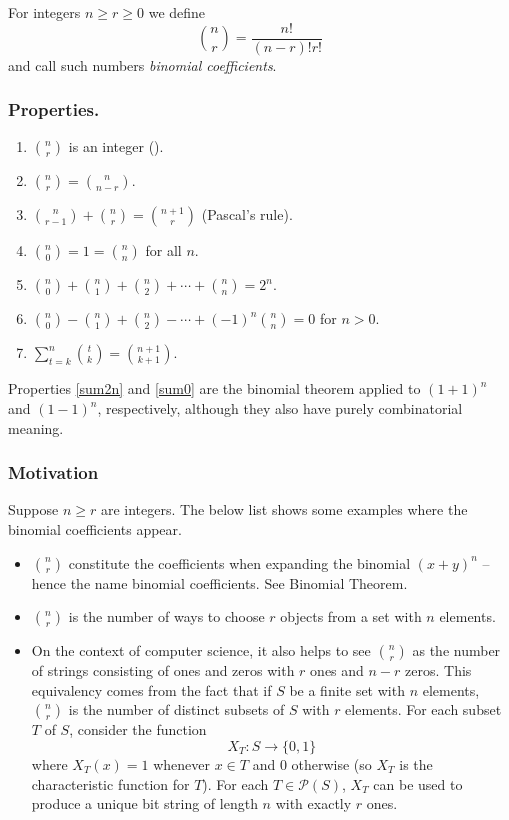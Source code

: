 \documentclass{article}
\begin{document}
For integers $n\ge r \ge 0$ we define 
$$ 
{n\choose r} = \frac{n!}{(n-r)!r!}
$$ 
and call such numbers \emph{binomial coefficients}.

\subsubsection*{Properties.}
\begin{enumerate}
\item \label{isinteger}
   $n\choose r$ is an integer (). 
\item \label{reverse}
   ${n\choose r}={n\choose n-r}$.
\item \label{pascal}
   ${n\choose r-1}+{n\choose r}={n+1\choose r}$ (Pascal's rule).
\item \label{boundaryterms}
   ${n\choose 0}=1={n\choose n}$ for all $n$.
\item \label{sum2n}
   ${n\choose 0}+{n\choose 1}+{n\choose 2}+\cdots+{n\choose n}=2^n$.
\item \label{sum0}
   ${n\choose 0}-{n\choose 1}+{n\choose 2}-\cdots+(-1)^n{n\choose n}=0$ for $n>0$.
\item \label{sump1}
   $\sum_{t=k}^n {t\choose k }={n+1\choose k+1}$.
\end{enumerate}

Properties \ref{sum2n} and \ref{sum0} are the binomial theorem
applied to $(1+1)^n$ and $(1-1)^n$, respectively, although they also have purely combinatorial meaning.

\subsubsection*{Motivation}
Suppose $n\ge r$ are integers. 
The below list shows some examples where the binomial coefficients
appear. 
\begin{itemize}
\item $n\choose r$ constitute the coefficients when expanding the
binomial $(x+y)^n$ -- hence the name binomial coefficients.
See Binomial Theorem. 
\item $n\choose r$ is the number of ways to choose $r$ objects from a set with $n$ elements.
\item On the context of computer science, it also helps to see ${n\choose r}$ as the number 
of strings consisting of ones and zeros with $r$ ones and $n-r$ zeros.
This equivalency comes from the fact that
if $S$ be a finite set with $n$ elements, ${n\choose r}$ is the number of distinct 
subsets of $S$ with $r$ elements.  For each subset $T$ of $S$, consider the function
$$
  X_T\colon S \rightarrow \{0,1\}
$$
where $X_T(x) = 1$ whenever $x \in T$ and $0$ otherwise (so $X_T$ is the characteristic function 
for $T$).  For each $T \in \mathcal{P}(S)$, $X_T$ can be used to produce a unique bit 
string of length $n$ with exactly $r$ ones.
\end{itemize}
\end{document}
